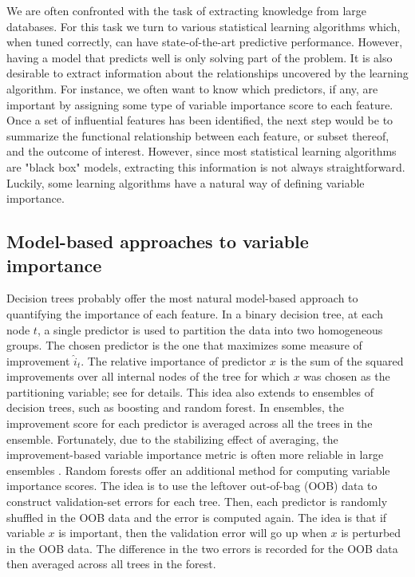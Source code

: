 \documentclass[12pt]{article}
\begin{document}
We are often confronted with the task of extracting knowledge from large databases. For this task we turn to various statistical learning algorithms which, when tuned correctly, can have state-of-the-art predictive performance. However, having a model that predicts well is only solving part of the problem. It is also desirable to extract information about the relationships uncovered by the learning algorithm. For instance, we often want to know which predictors, if any, are important by assigning some type of variable importance score to each feature. Once a set of influential features has been identified, the next step would be to summarize the functional relationship between each feature, or subset thereof, and the outcome of interest. However, since most statistical learning algorithms are "black box" models, extracting this information is not always straightforward. Luckily, some learning algorithms have a natural way of defining variable importance.


\subsection{Model-based approaches to variable importance}

Decision trees probably offer the most natural model-based approach to quantifying the importance of each feature. In a binary decision tree, at each node $t$, a single predictor is used to partition the data into two homogeneous groups. The chosen predictor is the one that maximizes some measure of improvement $\widehat{i}_t$. The relative importance of predictor $x$ is the sum of the squared improvements over all internal nodes of the tree for which $x$ was chosen as the partitioning variable; see \citet{classification-breiman-1984} for details. This idea also extends to ensembles of decision trees, such as boosting and random forest. In ensembles, the improvement score for each predictor is averaged across all the trees in the ensemble. Fortunately, due to the stabilizing effect of averaging, the improvement-based variable importance metric is often more reliable in large ensembles \citep[pg. 368]{hastie-elements-2009}. Random forests offer an additional method for computing variable importance scores. The idea is to use the leftover out-of-bag (OOB) data to construct validation-set errors for each tree. Then, each predictor is randomly shuffled in the OOB data and the error is computed again. The idea is that if variable $x$ is important, then the validation error will go up when $x$ is perturbed in the OOB data. The difference in the two errors is recorded for the OOB data then averaged across all trees in the forest.
\end{document}
